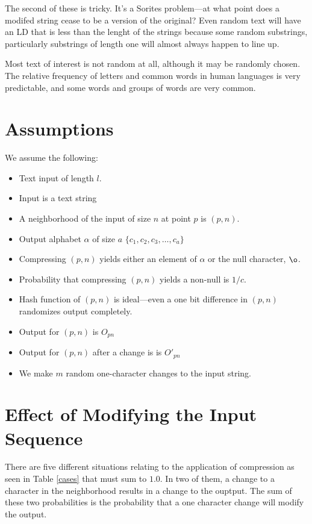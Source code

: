 \documentclass[html]{article}    %
\def\neigh {(p,n)}
\begin{document}
The second of these is tricky. It's a Sorites problem---at what point does a modifed string cease to be a version of the original?  
Even random text will have an LD that is less than the lenght of the strings because some random substrings, particularly
substrings of length one will almost always happen to line up.

Most text of interest is not random at all, although it may be randomly chosen. The relative frequency of letters and common words 
in human languages is very predictable, and some words and groups of words are very common.





\section{Assumptions}

We assume the following:

\begin{itemize}
\item Text input of length $l$. 
\item Input is a text string
\item A neighborhood of the input of size $n$ at point $p$ is $\neigh$.
\item Output alphabet $\alpha$ of size $a$ $\lbrace c_{1}, c_{2}, c_{3}, \dots, c_{a} \rbrace $ 
\item Compressing $\neigh$ yields either an element of $\alpha$ or the null character, $\o$.
\item Probability that compressing $\neigh$ yields a non-null is $1/c$.
\item Hash function of $\neigh$ is ideal---even a one bit difference in $\neigh$ randomizes output completely. 
\item Output for $\neigh$ is $O_{pn}$
\item Output for $\neigh$ after a change is is $O'_{pn}$
\item We make $m$ random one-character changes to the input string.
\end{itemize}
\vspace{5mm} 

\section{Effect of Modifying the Input Sequence}

There are five different situations relating to the application of compression as seen in Table \ref{cases} that 
must sum to $1.0$. 
In two of them, a change to a character in the neighborhood results in a change to the ouptput. 
The sum of these two probabilities is the probability that a one character change will modify the output. 
\end{document}
